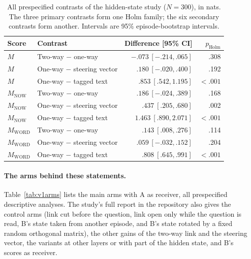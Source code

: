 \begin{table}[htbp]
\centering\small
\caption{All prespecified contrasts of the hidden-state study
($N=300$), in nats. The three primary contrasts form one Holm family;
the six secondary contrasts form another. Intervals are 95\%
episode-bootstrap intervals.}
\label{tab:v1contrasts}
\begin{tabular}{@{}llrr@{}}
\toprule
Score & Contrast & Difference [95\% CI] & $p_{\mathrm{Holm}}$ \\
\midrule
$M$ & Two-way $-$ one-way & $-.073\ [-.214,.065]$ & .308 \\
$M$ & One-way $-$ steering vector & $.180\ [-.020,.400]$ & .192 \\
$M$ & One-way $-$ tagged text & $.853\ [.542,1.195]$ & $<.001$ \\
\midrule
$M_{\mathrm{NOW}}$ & Two-way $-$ one-way & $.186\ [-.024,.389]$ & .168 \\
$M_{\mathrm{NOW}}$ & One-way $-$ steering vector & $.437\ [.205,.680]$ & .002 \\
$M_{\mathrm{NOW}}$ & One-way $-$ tagged text & $1.463\ [.890,2.071]$ & $<.001$ \\
$M_{\mathrm{WORD}}$ & Two-way $-$ one-way & $.143\ [.008,.276]$ & .114 \\
$M_{\mathrm{WORD}}$ & One-way $-$ steering vector & $.059\ [-.032,.152]$ & .204 \\
$M_{\mathrm{WORD}}$ & One-way $-$ tagged text & $.808\ [.645,.991]$ & $<.001$ \\
\bottomrule
\end{tabular}
\end{table}

\paragraph{The arms behind these statements.}
Table~\ref{tab:v1arms} lists the main arms with A as receiver, all
prespecified descriptive analyses. The study's full report in the
repository also gives the control arms (link cut before the question, link open only while the
question is read, B's state taken from another episode, and B's state
rotated by a fixed random orthogonal matrix), the other gains of the
two-way link and the steering vector, the variants at other layers or
with part of the hidden state, and B's scores as receiver.


